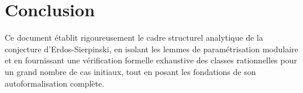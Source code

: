 \documentclass[12pt,a4paper]{article}
\begin{document}
\section{Conclusion}

Ce document établit rigoureusement le cadre structurel analytique de la conjecture d'Erdos-Sierpinski, en isolant les lemmes de paramétrisation modulaire et en fournissant une vérification formelle exhaustive des classes rationnelles pour un grand nombre de cas initiaux, tout en posant les fondations de son autoformalisation complète.
\end{document}
